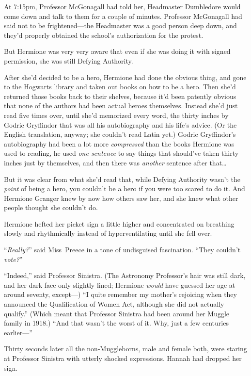 At 7:15pm, Professor McGonagall had told her, Headmaster Dumbledore would come down and talk to them for a couple of minutes. Professor McGonagall had said not to be frightened—the Headmaster was a good person deep down, and they’d properly obtained the school’s authorization for the protest.

But Hermione was very very aware that even if she was doing it with signed permission, she was still Defying Authority.

After she’d decided to be a hero, Hermione had done the obvious thing, and gone to the Hogwarts library and taken out books on how to be a hero. Then she’d returned those books back to their shelves, because it’d been patently obvious that none of the authors had been actual heroes themselves. Instead she’d just read five times over, until she’d memorized every word, the thirty inches by Godric Gryffindor that was all his autobiography and his life’s advice. (Or the English translation, anyway; she couldn’t read Latin yet.) Godric Gryffindor’s autobiography had been a lot more \emph{compressed} than the books Hermione was used to reading, he used \emph{one sentence} to say things that should’ve taken thirty inches just by themselves, and then there was \emph{another} sentence after that…

But it was clear from what she’d read that, while Defying Authority wasn’t the \emph{point} of being a hero, you couldn’t be a hero if you were too scared to do it. And Hermione Granger knew by now how others saw her, and she knew what other people thought she couldn’t do.

Hermione hefted her picket sign a little higher and concentrated on breathing slowly and rhythmically instead of hyperventilating until she fell over.

“\emph{Really?}” said Miss~Preece in a tone of undisguised fascination. “They couldn’t \emph{vote?}”

“Indeed,” said Professor Sinistra. (The Astronomy Professor’s hair was still dark, and her dark face only slightly lined; Hermione \emph{would} have guessed her age at around seventy, except—) “I quite remember my mother’s rejoicing when they announced the Qualification of Women Act, although she did not actually qualify.” (Which meant that Professor Sinistra had been around her Muggle family in 1918.) “And that wasn’t the worst of it. Why, just a few centuries earlier—”

Thirty seconds later all the non-Muggleborns, male and female both, were staring at Professor Sinistra with utterly shocked expressions. Hannah had dropped her sign.


